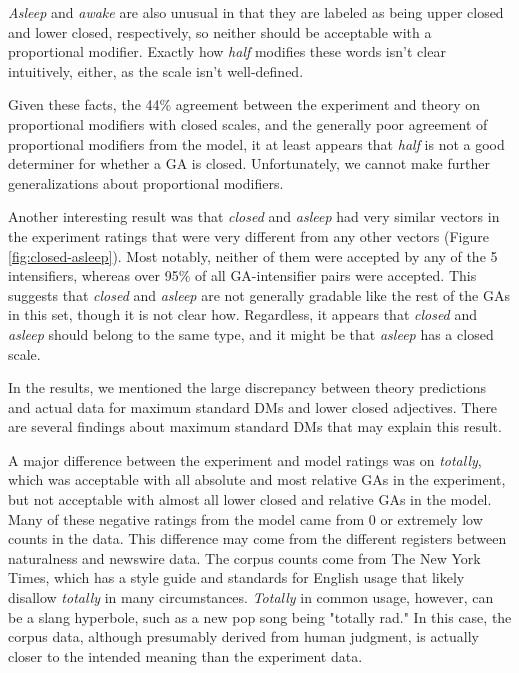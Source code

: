 \documentclass[11pt]{article}
\begin{document}
\textit{Asleep} and \textit{awake} are also unusual in that they are labeled as being upper closed and lower closed, respectively, so neither should be acceptable with a proportional modifier. Exactly how \textit{half} modifies these words isn't clear intuitively, either, as the scale isn't well-defined.

Given these facts, the 44\% agreement between the experiment and theory on proportional modifiers with closed scales, and the generally poor agreement of proportional modifiers from the model, it at least appears that \textit{half} is not a good determiner for whether a GA is closed. Unfortunately, we cannot make further generalizations about proportional modifiers. 

Another interesting result was that \textit{closed} and \textit{asleep} had very similar vectors in the experiment ratings that were very different from any other vectors (Figure \ref{fig:closed-asleep}). Most notably, neither of them were accepted by any of the 5 intensifiers, whereas over 95\% of all GA-intensifier pairs were accepted. This suggests that \textit{closed} and \textit{asleep} are not generally gradable like the rest of the GAs in this set, though it is not clear how. Regardless, it appears that \textit{closed} and \textit{asleep} should belong to the same type, and it might be that \textit{asleep} has a closed scale.

In the results, we mentioned the large discrepancy between theory predictions and actual data for maximum standard DMs and lower closed adjectives. There are several findings about maximum standard DMs that may explain this result.

A major difference between the experiment and model ratings was on \textit{totally}, which was acceptable with all absolute and most relative GAs in the experiment, but not acceptable with almost all lower closed and relative GAs in the model. Many of these negative ratings from the model came from 0 or extremely low counts in the data. This difference may come from the different registers between naturalness and newswire data. The corpus counts come from The New York Times, which has a style guide and standards for English usage that likely disallow \textit{totally} in many circumstances. \textit{Totally} in common usage, however, can be a slang hyperbole, such as a new pop song being "totally rad." In this case, the corpus data, although presumably derived from human judgment, is actually closer to the intended meaning than the experiment data.
\end{document}
